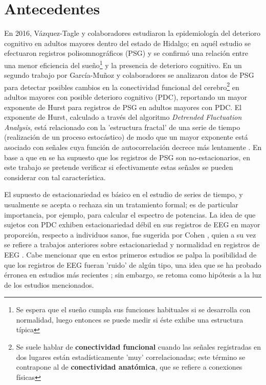 \documentclass[12pt,a4paper]{mitthesis}
\begin{document}
\setcounter{page}{1}

\chapter{Antecedentes}

En 2016, V\'azquez-Tagle y colaboradores \cite{VazquezTagle16} estudiaron la epidemiolog\'ia del 
deterioro cognitivo en adultos mayores dentro del estado de Hidalgo; en aqu\'el estudio se 
efectuaron registros polisomnogr\'aficos (PSG) y se confirm\'o una relaci\'on entre una menor 
eficiencia del sue\~no\footnote{Se espera que el sue\~no cumpla sus funciones habituales si se 
desarrolla con normalidad, luego entonces se puede medir si \'este exhibe una estructura t\'ipica} 
y la presencia de deterioro cognitivo.
En un segundo trabajo por Garc\'ia-Mu\~noz y colaboradores \cite{Valeria} se analizaron datos de 
PSG para detectar posibles cambios en la conectividad funcional del cerebro\footnote{Se suele 
hablar de \textbf{conectividad funcional} cuando las se\~nales registradas en dos lugares est\'an 
estad\'isticamente 'muy' correlacionadas; este t\'ermino se contrapone al de \textbf{conectividad 
anat\'omica}, que se refiere a conexiones f\'isicas} en adultos mayores con posible deterioro 
cognitivo (PDC), reportando un mayor exponente de Hurst para registros de PSG en adultos mayores 
con PDC.
El exponente de Hurst, calculado a trav\'es del algoritmo \textit{Detrended Fluctuation Analysis}, 
est\'a relacionado con la 'estructura fractal' de una serie de tiempo (realizaci\'on de un proceso 
estoc\'astico) de modo que un mayor exponente est\'a asociado con se\~nales cuya funci\'on de 
autocorrelaci\'on decrece m\'as lentamente \cite{Bryce12}.
En base a que en \cite{Valeria} se ha supuesto que los registros de PSG son no-estacionarios, en 
este trabajo se pretende verificar si efectivamente estas se\~nales se pueden considerar con tal
caracter\'istica.

El supuesto de estacionariedad es b\'asico en el estudio de series de tiempo, y usualmente se 
acepta o rechaza sin un tratamiento formal; es de particular importancia, por ejemplo, para 
calcular el espectro de potencias.
La idea de que sujetos con PDC exhiben estacionariedad d\'ebil en sus registros de EEG en mayor 
proporci\'on, respecto a individuos sanos, fue sugerida por Cohen \cite{Cohen77}, quien a su vez se 
refiere a trabajos anteriores sobre estacionariedad y normalidad en registros de EEG 
\cite{McEwen75,Sugimoto78,Kawabata73}.
Cabe mencionar que en estos primeros estudios se palpa la posibilidad de que los registros de EEG 
fueran 'ruido' de alg\'un tipo, una idea que se ha probado \'erronea en estudios m\'as recientes 
\cite{Klonowski09}; sin embargo, se retoma como hip\'otesis a la luz de los estudios mencionados. 
\end{document}
